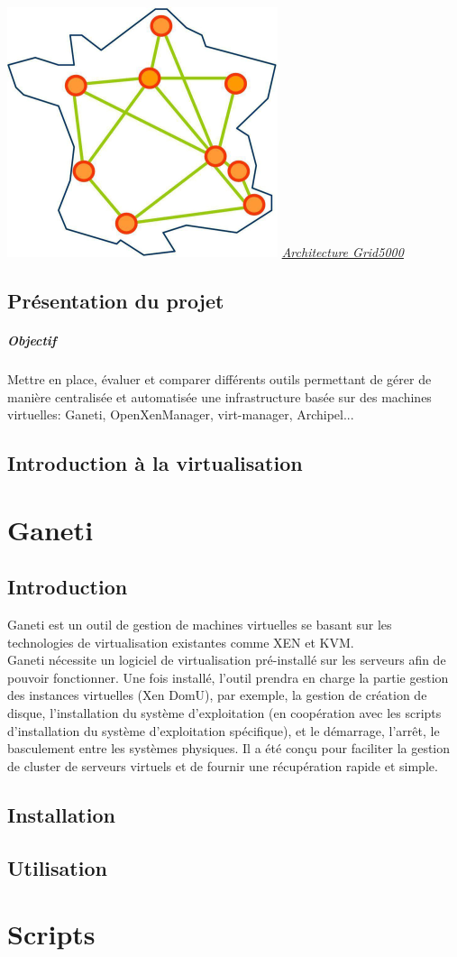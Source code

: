 \documentclass[a4paper,11pt]{report}
\begin{document}
\newpage
\begin{center}
\includegraphics{g5k.png}
\underline{\textit{Architecture Grid5000}}
\end{center}

\newpage
\section{Présentation du projet}
\paragraph{Objectif}
Mettre en place, évaluer et comparer différents outils permettant de gérer de manière
centralisée et automatisée une infrastructure basée sur des machines virtuelles: Ganeti,
OpenXenManager, virt-manager, Archipel...
\section{Introduction à la virtualisation}

\chapter{Ganeti}
\section{Introduction}
Ganeti est un outil de gestion de machines virtuelles se basant sur les technologies de virtualisation existantes comme XEN et KVM.\\
Ganeti nécessite un logiciel de virtualisation pré-installé sur les serveurs afin de pouvoir fonctionner. Une fois installé, 
l'outil prendra en charge la partie gestion des instances virtuelles (Xen DomU), par exemple, la gestion de création de disque, 
l'installation du système d'exploitation (en coopération avec les scripts d'installation du système d'exploitation 
spécifique), et le démarrage, l'arrêt, le basculement entre les systèmes physiques. Il a été conçu pour faciliter la gestion de 
cluster de serveurs virtuels et de fournir une récupération rapide et simple.
\section{Installation}
\section{Utilisation}

\chapter{Scripts}

      
\newpage


      \newpage
\end{document}
